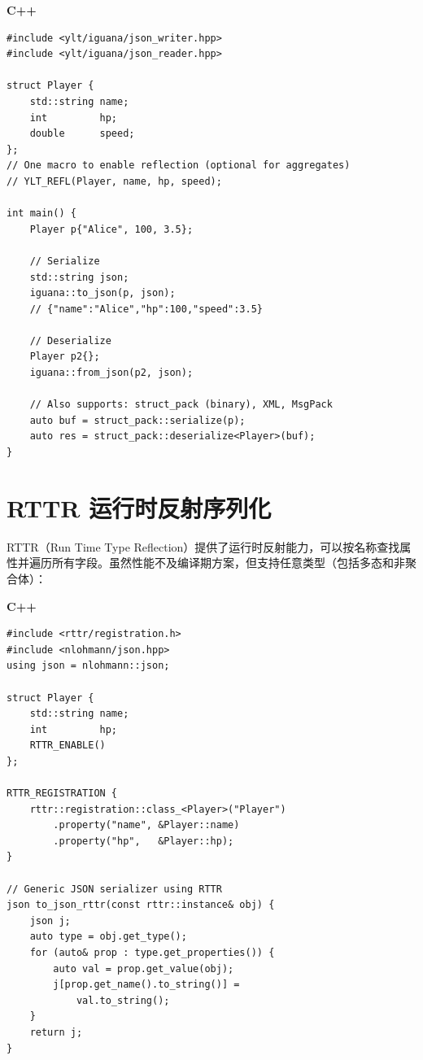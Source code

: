 \documentclass[12pt,a4paper,fontset=fandol]{ctexbook}
\newcommand{\cpplabel}{%
  \noindent\begin{tcolorbox}[colback=algheadbg,coltext=white,
    sharp corners,boxrule=0pt,width=3.0em,height=1.4em,
    halign=center,valign=center,nobeforeafter,left=0pt,right=0pt,
    top=0pt,bottom=0pt]\small\bfseries C++\end{tcolorbox}}
\begin{document}
\cpplabel
\begin{lstlisting}[caption={雅兰亭 iguana: 零样板 JSON 序列化}]
#include <ylt/iguana/json_writer.hpp>
#include <ylt/iguana/json_reader.hpp>

struct Player {
    std::string name;
    int         hp;
    double      speed;
};
// One macro to enable reflection (optional for aggregates)
// YLT_REFL(Player, name, hp, speed);

int main() {
    Player p{"Alice", 100, 3.5};

    // Serialize
    std::string json;
    iguana::to_json(p, json);
    // {"name":"Alice","hp":100,"speed":3.5}

    // Deserialize
    Player p2{};
    iguana::from_json(p2, json);

    // Also supports: struct_pack (binary), XML, MsgPack
    auto buf = struct_pack::serialize(p);
    auto res = struct_pack::deserialize<Player>(buf);
}
\end{lstlisting}

\section{RTTR 运行时反射序列化}\label{sec:rttr-serial}

RTTR（Run Time Type Reflection）提供了运行时反射能力，可以按名称查找属性并遍历所有字段。虽然性能不及编译期方案，但支持任意类型（包括多态和非聚合体）：

\cpplabel
\begin{lstlisting}[caption={RTTR: 运行时反射驱动的泛型序列化}]
#include <rttr/registration.h>
#include <nlohmann/json.hpp>
using json = nlohmann::json;

struct Player {
    std::string name;
    int         hp;
    RTTR_ENABLE()
};

RTTR_REGISTRATION {
    rttr::registration::class_<Player>("Player")
        .property("name", &Player::name)
        .property("hp",   &Player::hp);
}

// Generic JSON serializer using RTTR
json to_json_rttr(const rttr::instance& obj) {
    json j;
    auto type = obj.get_type();
    for (auto& prop : type.get_properties()) {
        auto val = prop.get_value(obj);
        j[prop.get_name().to_string()] =
            val.to_string();
    }
    return j;
}
\end{lstlisting}
\end{document}
